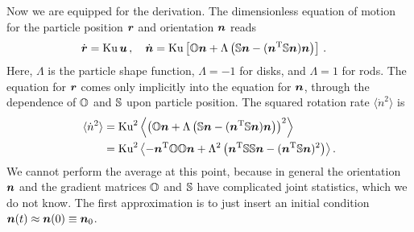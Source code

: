\documentclass[thesis.tex]{subfiles}
\begin{document}
Now we are equipped for the derivation. The dimensionless equation of motion for the particle position $\mbox{\boldmath$r$}$ and orientation $\mbox{\boldmath$n$}$ reads
\begin{align*}
\dot{\mbox{\boldmath$r$}}&=\mbox{Ku}\,\mbox{\boldmath$u$}\,,\quad
\dot{\mbox{\boldmath$n$}}=\mbox{Ku}\left[\mathbb{O}\mbox{\boldmath$n$}+\Lambda\left(\mathbb{S}\mbox{\boldmath$n$}-(\mbox{\boldmath$n$}^{\mathrm T}\mathbb{S}\mbox{\boldmath$n$})\mbox{\boldmath$n$}\right)\right]\,.
\end{align*}
Here, $\Lambda$ is the particle shape function, $\Lambda=-1$ for disks, and $\Lambda=1$ for rods. The equation for $\mbox{\boldmath$r$}$ comes only implicitly into the equation for $\mbox{\boldmath$n$}$, through the dependence of $\mathbb{O}$ and $\mathbb{S}$ upon particle position.
The squared rotation rate $\langle \dot n^2\rangle$ is
\begin{align}
	\langle \dot n^2\rangle &= \ku^2\left\langle\left(\ma O\ve n+\Lambda\left(\ma S\ve n-(\ve n\transpose\ma S\ve n)\ve n\right)\right)^2\right\rangle\nn \\
	&= \ku^2\left\langle-\ve n\transpose \ma O \ma O \ve n + \Lambda^2\left(\ve n\transpose\ma S\ma S\ve n - (\ve n\transpose\ma S\ve n)^2\right)\right\rangle.\eqnlab{ndotsquared}
\end{align}
We cannot perform the average at this point, because in general the orientation $\mbox{\boldmath$n$}$ and the gradient matrices $\mathbb{O}$ and $\mathbb{S}$ have complicated joint statistics, which we do not know. 
The first approximation is to just insert an initial condition $\mbox{\boldmath$n$}(t) \approx \mbox{\boldmath$n$}(0) \equiv \mbox{\boldmath$n$}_0$.
\end{document}
